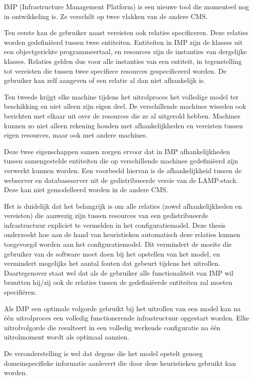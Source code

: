 IMP (Infrastructure Management Platform)\cite{IMP} is een nieuwe tool die momenteel nog in ontwikkeling is.
Ze verschilt op twee vlakken van de andere CMS.

Ten eerste kan de gebruiker naast vereisten ook relaties specificeren.
Deze relaties worden gedefini\"eerd tussen twee entiteiten. 
Entiteiten in IMP zijn de klasses uit een objectgerichte programmeertaal, en resources zijn de instanties van dergelijke klasses.
Relaties gelden dus voor alle instanties van een entiteit, in tegenstelling tot vereisten die tussen twee specifiece resources gespecificeerd worden.
De gebruiker kan zelf aangeven of een relatie al dan niet afhankelijk is.

Ten tweede krijgt elke machine tijdens het uitrolproces het volledige model ter beschikking en niet alleen zijn eigen deel.
De verschillende machines wisselen ook berichten met elkaar uit over de resources die ze al uitgerold hebben.
Machines kunnen zo niet alleen rekening houden met afhankelijkheden en vereisten tussen eigen resources, maar ook met andere machines.

Deze twee eigenschappen samen zorgen ervoor dat in IMP afhankelijkheden tussen samengestelde entiteiten die op verschillende machines gedefini\"eerd zijn verwerkt kunnen worden.
Een voorbeeld hiervan is de afhankelijkheid tussen de webserver en databaseserver uit de gedistribueerde versie van de LAMP-stack.
Deze kan niet gemodelleerd worden in de andere CMS. 

Het is duidelijk dat het belangrijk is om alle relaties (zowel afhankelijkheden en vereisten) die aanwezig zijn tussen resources van een gedistribueerde infrastructuur expliciet te vermelden in het configuratiemodel.
Deze thesis onderzoekt hoe aan de hand van heuristieken automatisch deze relaties kunnen toegevoegd worden aan het configuratiemodel.
Dit vermindert de moeite die gebruiker van de software moet doen bij het opstellen van het model, en vermindert mogelijks het aantal fouten dat gebeurt tijdens het uitrollen.
Daartegenover staat wel dat als de gebruiker alle functionaliteit van IMP wil benutten hij/zij ook de relaties tussen de gedefini\"eerde entiteiten zal moeten specifi\"eren.

Als IMP een optimale volgorde gebruikt bij het uitrollen van een model kan na \'e\'en uitrolproces een volledig functionerende infrastructuur opgestart worden.
Elke uitrolvolgorde die resulteert in een volledig werkende configuratie na \'e\'en uitrolmoment wordt als optimaal aanzien.

De veronderstelling is wel dat degene die het model opstelt genoeg domeinspecifieke informatie aanlevert die door deze heuristieken gebruikt kan worden.
